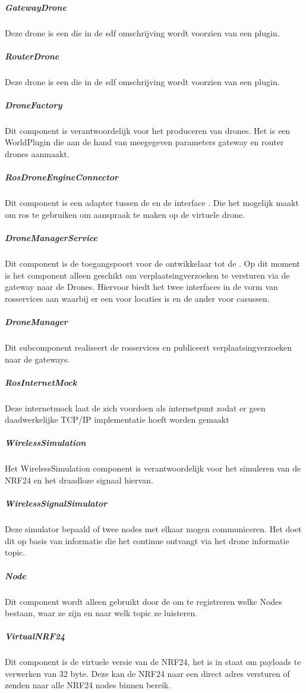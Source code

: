 \documentclass[a4paper, 11pt, oneside]{report}
\begin{document}
\subparagraph{GatewayDrone}
\label{architectural:subcomponenten:GatewayDrone}
Deze drone is een  die in de sdf omschrijving wordt voorzien van een  plugin. 
\subparagraph{RouterDrone}
\label{architectural:subcomponenten:RouterDrone}
Deze drone is een  die in de sdf omschrijving wordt voorzien van een  plugin. 

\subparagraph{DroneFactory}
\label{architectural:subcomponenten:DroneFactory}
Dit component is verantwoordelijk voor het produceren van drones. Het is een WorldPlugin die aan de hand van meegegeven parameters gateway en router drones aanmaakt.  

\subparagraph{RosDroneEngineConnector}
\label{architectural:subcomponenten:RosDroneEngineConnector}
Dit component is een adapter tussen de  en de interface . Die het mogelijk maakt om ros te gebruiken om aanspraak te maken op de virtuele drone.

\subparagraph{DroneManagerService}
\label{architectural:subcomponenten:DroneManagerService}
Dit component is de toegangspoort voor de ontwikkelaar tot de .
Op dit moment is het component alleen geschikt om verplaatsingverzoeken te versturen via de gateway naar de Drones.
Hiervoor biedt het twee interfaces in de vorm van rosservices aan waarbij er een voor locaties is en de ander voor casussen. 

\subparagraph{DroneManager}
\label{architectural:subcomponenten:DroneManager}
Dit subcomponent realiseert de rosservices en publiceert verplaatsingverzoeken naar de gateways.  

\subparagraph{RosInternetMock}
\label{architectural:subcomponenten:RosInternetMock}
Deze internetmock laat de  zich voordoen als internetpunt zodat er geen daadwerkelijke TCP/IP implementatie hoeft worden gemaakt 
\subparagraph{WirelessSimulation}
\label{architectural:subcomponenten:WirelessSimulation}
Het WirelessSimulation component is verantwoordelijk voor het simuleren van de NRF24 en het draadloze signaal hiervan. 
\subparagraph{WirelessSignalSimulator}
\label{architectural:subcomponenten:WirelessSignalSimulator}
Deze simulator bepaald of twee nodes met elkaar mogen communiceren. Het doet dit op basis van informatie die het continue ontvangt via het drone informatie topic. 
\subparagraph{Node}
\label{architectural:subcomponenten:Node}
Dit component wordt alleen gebruikt door de  om te registreren welke Nodes bestaan, waar ze zijn en naar welk topic ze luisteren.
\subparagraph{VirtualNRF24}
\label{architectural:subcomponenten:VirtualNRF24}
Dit component is de virtuele versie van de NRF24, het is in staat om payloads te verwerken van 32 byte.
Deze kan de NRF24 naar een direct adres versturen of zenden naar alle NRF24 nodes binnen bereik.
\end{document}
